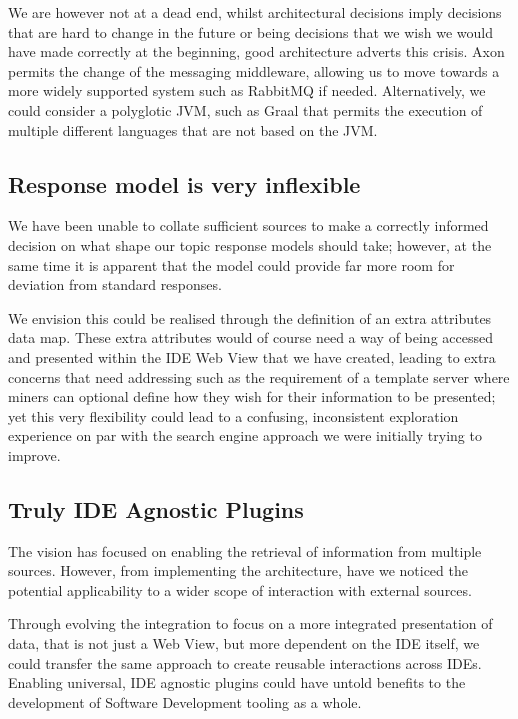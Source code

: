We are however not at a dead end, whilst architectural decisions imply decisions that are hard to change in the future or being decisions that we wish we would have made correctly at the beginning, good architecture adverts this crisis. Axon permits the change of the messaging middleware, allowing us to move towards a more widely supported system such as RabbitMQ if needed. Alternatively, we could consider a polyglotic JVM, such as Graal that permits the execution of multiple different languages that are not based on the JVM.

\subsection{Response model is very inflexible}

We have been unable to collate sufficient sources to make a correctly informed decision on what shape our topic response models should take; however, at the same time it is apparent that the model could provide far more room for deviation from standard responses. 

We envision this could be realised through the definition of an extra attributes data map. These extra attributes would of course need a way of being accessed and presented within the IDE Web View that we have created, leading to extra concerns that need addressing such as the requirement of a template server where miners can optional define how they wish for their information to be presented; yet this very flexibility could lead to a confusing, inconsistent exploration experience on par with the search engine approach we were initially trying to improve.

\subsection{Truly IDE Agnostic Plugins}

The vision has focused on enabling the retrieval of information from multiple sources. However, from implementing the architecture, have we noticed the potential applicability to a wider scope of interaction with external sources.

Through evolving the integration to focus on a more integrated presentation of data, that is not just a Web View, but more dependent on the IDE itself, we could transfer the same approach to create reusable interactions across IDEs. Enabling universal, IDE agnostic plugins could have untold benefits to the development of Software Development tooling as a whole. 

